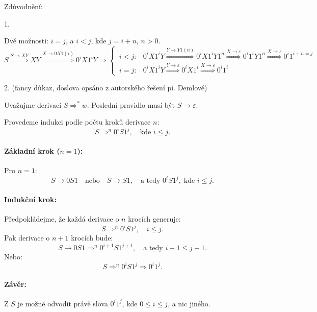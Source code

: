 Zdůvodnění: 

1. 

Dvě možnosti: $ i = j$, a $i < j$, kde $j = i + n$, $n > 0$. 
\[
    S \stackrel{S \rightarrow XY}{\Longrightarrow} XY \stackrel{X \rightarrow 0X1 (i)}{\Longrightarrow} 0^i X 1^i Y  
    \Longrightarrow
\begin{cases}
    \ i < j:  & 0^i X 1^i Y \stackrel {Y \rightarrow Y1 (n)}{\Longrightarrow} 0^i X 1^i Y 1^n \stackrel{X \rightarrow 
    \varepsilon}{\Longrightarrow}0^i 1^i Y 1^n \stackrel{X \rightarrow \varepsilon}{\Longrightarrow} 0^i 1^{i+n = j} \\
    \ i = j: & 0^i X 1^i Y \stackrel{Y \rightarrow \varepsilon}{\Longrightarrow} 0^i X 1^i \stackrel{X \rightarrow 
    \varepsilon}{\Longrightarrow} 0^i 1^i
\end{cases}
\]

2. (fancy důkaz, doslova opsáno z autorského řešení pí. Demlové)

Uvažujme derivaci \( S \Rightarrow^* w \). Poslední pravidlo musí být \( S \rightarrow \varepsilon \).

Provedeme indukci podle počtu kroků derivace \( n \):
\[
S \Rightarrow^n 0^i S 1^j, \quad \text{kde } i \leq j.
\]

\paragraph{Základní krok (\(n = 1\)):}
Pro \(n = 1\):
\[
S \rightarrow 0 S 1 \quad \text{nebo} \quad S \rightarrow S 1, \quad \text{a tedy } 0^i S 1^j, \; \text{kde } i \leq j.
\]

\paragraph{Indukční krok:}
Předpokládejme, že každá derivace o \(n\) krocích generuje:
\[
S \Rightarrow^n 0^i S 1^j, \quad i \leq j.
\]
Pak derivace o \(n+1\) krocích bude:
\[
S \rightarrow 0 S 1 \Rightarrow^n 0^{i+1} S 1^{j+1}, \quad \text{a tedy } i+1 \leq j+1.
\]
Nebo:
\[
S \Rightarrow^n 0^i S 1^j \Rightarrow 0^i 1^j.
\]

\paragraph{Závěr:}
Z \(S\) je možné odvodit právě slova \(0^i 1^j\), kde \(0 \leq i \leq j\), a nic jiného.


